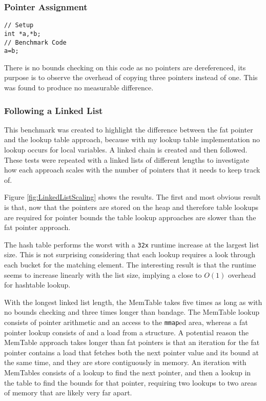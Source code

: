 \subsubsection{Pointer Assignment}

\begin{verbatim}
// Setup
int *a,*b;
// Benchmark Code
a=b;
\end{verbatim}

There is no bounds checking on this code as no pointers are dereferenced, its purpose is to observe the overhead of copying three pointers instead of one.
This was found to produce no measurable difference.

\subsubsection{Following a Linked List}

This benchmark was created to highlight the difference between the fat pointer and the lookup table approach, because with my lookup table implementation no lookup occurs for local variables.
A linked chain is created and then followed.
These tests were repeated with a linked lists of different lengths to investigate how each approach scales with the number of pointers that it needs to keep track of.

Figure \ref{fig:LinkedListScaling} shows the results.
The first and most obvious result is that, now that the pointers are stored on the heap and therefore table lookups are required for pointer bounds the table lookup approaches are slower than the fat pointer approach.



The hash table performs the worst with a \verb!32x! runtime increase at the largest list size.
This is not surprising considering that each lookup requires a look through each bucket for the matching element.
The interesting result is that the runtime seems to increase linearly with the list size, implying a close to $O(1)$ overhead for hashtable lookup.

With the longest linked list length, the MemTable takes five times as long as with no bounds checking and three times longer than bandage.
The MemTable lookup consists of pointer arithmetic and an access to the \verb!mmap!ed area, whereas a fat pointer lookup consists of and a load from a structure.
A potential reason the MemTable approach takes longer than fat pointers is that an iteration for the fat pointer contains a load that fetches both the next pointer value and its bound at the same time, and they are store contiguously in memory.
An iteration with MemTables consists of a lookup to find the next pointer, and then a lookup in the table to find the bounds for that pointer, requiring two lookups to two areas of memory that are likely very far apart.

